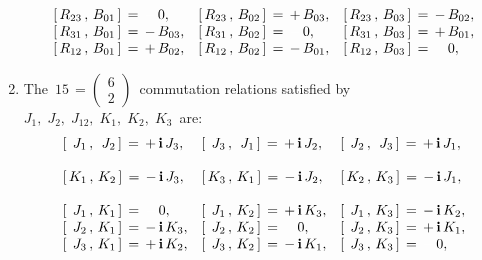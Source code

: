 \begin{corollary}
\begin{enumerate}
\begin{equation*}
\begin{array}{lll}
	\left[\,R_{23}\,,\,B_{01}\,\right] \,=\, {\color{white}-}\,0,\;\;\;\; &
	\left[\,R_{23}\,,\,B_{02}\,\right] \,=\, +\,B_{03}, &
	\left[\,R_{23}\,,\,B_{03}\,\right] \,=\, -\,B_{02}, 
	\\
	\left[\,R_{31}\,,\,B_{01}\,\right] \,=\, -\,B_{03}, &
	\left[\,R_{31}\,,\,B_{02}\,\right] \,=\, {\color{white}-}\,0,\;\;\;\; &
	\left[\,R_{31}\,,\,B_{03}\,\right] \,=\, +\,B_{01},
	\\
	\left[\,R_{12}\,,\,B_{01}\,\right] \,=\, +\,B_{02}, &
	\left[\,R_{12}\,,\,B_{02}\,\right] \,=\, -\,B_{01}, &
	\left[\,R_{12}\,,\,B_{03}\,\right] \,=\, {\color{white}-}\,0,\;\;\;\;
	\end{array}
	\end{equation*}
\item
	The
	\,$15 \,= \left(\begin{array}{c}6 \\ 2\end{array}\right)$\,
	commutation relations satisfied by
	\,$J_{1},\; J_{2},\; J_{12},\; K_{1},\; K_{2},\; K_{3}$\,
	are:
	\begin{equation*}
	\begin{array}{lll}
	\left[\,\;J_{1}\,,\,\;J_{2}\,\right] \,=\, + \, \i \, J_{3}, &
	\left[\,\;J_{3}\,,\,\;J_{1}\,\right] \,=\, + \, \i \, J_{2}, &
	\left[\,\;J_{2}\,,\,\;J_{3}\,\right] \,=\, + \, \i \, J_{1},
	\\ \\
	\left[\,K_{1}\,,\,K_{2}\,\right] \,=\, - \, \i \, J_{3}, &
	\left[\,K_{3}\,,\,K_{1}\,\right] \,=\, - \, \i \, J_{2}, &
	\left[\,K_{2}\,,\,K_{3}\,\right] \,=\, - \, \i \, J_{1},
	\\ \\
	\left[\,\;J_{1}\,,\,K_{1}\,\right] \,=\, {\color{white}-}\,0,\;\;\;\; &
	\left[\,\;J_{1}\,,\,K_{2}\,\right] \,=\, + \, \i \, K_{3}, &
	\left[\,\;J_{1}\,,\,K_{3}\,\right] \,=\, - \, \i \, K_{2},
	\\
	\left[\,\;J_{2}\,,\,K_{1}\,\right] \,=\, - \, \i \, K_{3}, &
	\left[\,\;J_{2}\,,\,K_{2}\,\right] \,=\, {\color{white}-}\,0,\;\;\;\; &
	\left[\,\;J_{2}\,,\,K_{3}\,\right] \,=\, + \, \i \, K_{1},
	\\
	\left[\,\;J_{3}\,,\,K_{1}\,\right] \,=\, + \, \i \, K_{2}, &
	\left[\,\;J_{3}\,,\,K_{2}\,\right] \,=\, - \, \i \, K_{1}, &
	\left[\,\;J_{3}\,,\,K_{3}\,\right] \,=\, {\color{white}-}\,0,\;\;\;\;
	\end{array}
	\end{equation*}
\end{enumerate}
\end{corollary}
\proof

